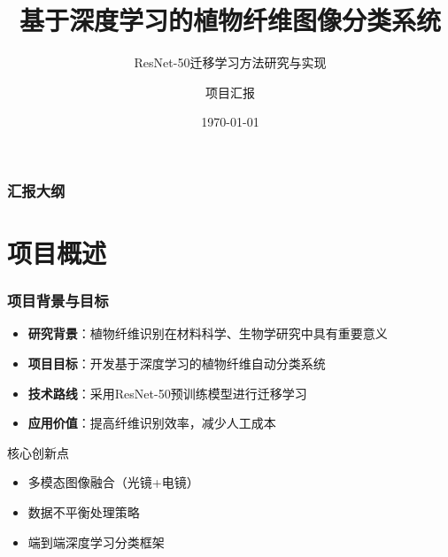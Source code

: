 \documentclass[12pt]{beamer}
\title{基于深度学习的植物纤维图像分类系统}
\subtitle{ResNet-50迁移学习方法研究与实现}
\author{项目汇报}
\institute{植物纤维识别项目组}
\date{\today}
\begin{document}
\frame{\titlepage}

\begin{frame}
\frametitle{汇报大纲}
\tableofcontents
\end{frame}

\section{项目概述}

\begin{frame}
\frametitle{项目背景与目标}
\begin{itemize}
    \item \textbf{研究背景}：植物纤维识别在材料科学、生物学研究中具有重要意义
    \item \textbf{项目目标}：开发基于深度学习的植物纤维自动分类系统
    \item \textbf{技术路线}：采用ResNet-50预训练模型进行迁移学习
    \item \textbf{应用价值}：提高纤维识别效率，减少人工成本
\end{itemize}

\vspace{0.5cm}
\begin{block}{核心创新点}
\begin{itemize}
    \item 多模态图像融合（光镜+电镜）
    \item 数据不平衡处理策略
    \item 端到端深度学习分类框架
\end{itemize}
\end{block}
\end{frame}
\end{document}
